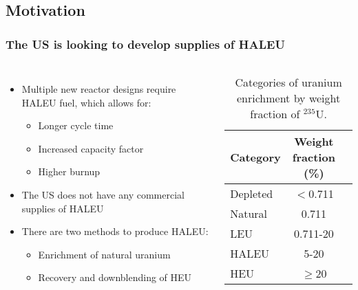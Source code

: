 \subsection{Motivation}
\begin{frame}
    \frametitle{The US is looking to develop supplies of HALEU}
    \begin{columns}
        \column[t]{5cm}
    \begin{itemize}
    \item Multiple new reactor designs require \gls{HALEU} fuel, which allows for: 
    \begin{itemize}
        \item Longer cycle time
        \item Increased capacity factor
        \item Higher burnup 
    \end{itemize}
    \item<2-> The US does not have any commercial supplies of \gls{HALEU}
    \item<3-> There are two methods to produce \gls{HALEU}:
    \begin{itemize}
        \item Enrichment of natural uranium
        \item Recovery and downblending of \gls{HEU}
    \end{itemize}
    
    \end{itemize}

    \column[t]{5cm}
    \begin{table}
        \centering
        \caption{Categories of uranium enrichment by weight fraction of 
        $^{235}$U.}
        \label{tab:enrichemnt}
        \begin{tabular}{l c c}
            \hline
            Category & Weight fraction (\%)\\\hline
            Depleted & $<$0.711 \\
            Natural & 0.711 \\
            LEU & 0.711-20 \\
            \gls{HALEU} & 5-20 \\
            \gls{HEU} & $\ge$20 \\
            \hline
        \end{tabular}
    \end{table}
    \end{columns}
\end{frame}

